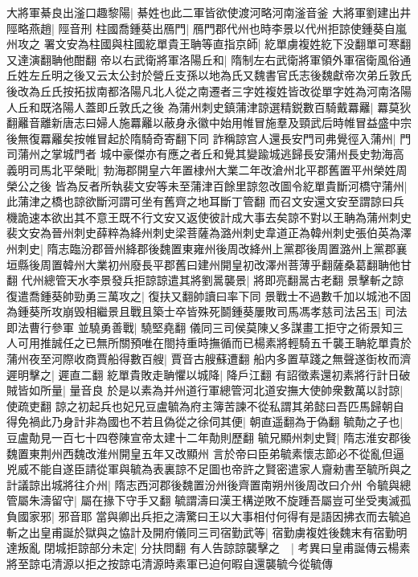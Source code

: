 大將軍綦良出滏口趣黎陽|{
	綦姓也此二軍皆欲使渡河略河南滏音釜}
大將軍劉建出井陘略燕趙|{
	陘音刑}
柱國喬鍾葵出鴈門|{
	鴈門郡代州也時李景以代州拒諒使鍾葵自嵐州攻之}
署文安為柱國與柱國紇單貴王聃等直指京師|{
	紇單虜複姓紇下没翻單可寒翻又達演翻聃他酣翻}
帝以右武衛將軍洛陽丘和|{
	隋制左右武衛將軍領外軍宿衛風俗通丘姓左丘明之後又云太公封於營丘支孫以地為氏又魏書官氏志後魏獻帝次弟丘敦氏後改為丘氏按拓拔南都洛陽凡北人從之南遷者三字姓複姓皆改從單字姓為河南洛陽人丘和既洛陽人蓋即丘敦氏之後}
為蒲州刺史鎮蒲津諒選精鋭數百騎戴羃䍦|{
	羃莫狄翻䍦音離新唐志曰婦人施羃䍦以蔽身永徽中始用帷冒施羣及頸武后時帷冒益盛中宗後無復羃䍦矣按帷冒起於隋騎奇寄翻下同}
詐稱諒宫人還長安門司弗覺徑入蒲州|{
	門司蒲州之掌城門者}
城中豪傑亦有應之者丘和覺其變踰城逃歸長安蒲州長史勃海高義明司馬北平榮毗|{
	勃海郡開皇六年置棣州大業二年改滄州北平郡舊置平州榮姓周榮公之後}
皆為反者所執裴文安等未至蒲津百餘里諒忽改圖令紇單貴斷河橋守蒲州|{
	此蒲津之橋也諒欲斷河謂可坐有舊齊之地耳斷丁管翻}
而召文安還文安至謂諒曰兵機詭速本欲出其不意王既不行文安又返使彼計成大事去矣諒不對以王聃為蒲州刺史裴文安為晉州刺史薛粹為絳州刺史梁菩薩為潞州刺史韋道正為韓州刺史張伯英為澤州刺史|{
	隋志臨汾郡晉州絳郡後魏置東雍州後周改絳州上黨郡後周置潞州上黨郡襄垣縣後周置韓州大業初州廢長平郡舊曰建州開皇初改澤州菩薄乎翻薩桑葛翻聃他甘翻}
代州總管天水李景發兵拒諒諒遣其將劉暠襲景|{
	將即亮翻暠古老翻}
景擊斬之諒復遣喬鍾葵帥勁勇三萬攻之|{
	復扶又翻帥讀曰率下同}
景戰士不過數千加以城池不固為鍾葵所攻崩毁相繼景且戰且築士卒皆殊死鬬鍾葵屢敗司馬馮孝慈司法呂玉|{
	司法即法曹行參軍}
並驍勇善戰|{
	驍堅堯翻}
儀同三司侯莫陳乂多謀畫工拒守之術景知三人可用推誠任之已無所關預唯在閤持重時撫循而已楊素將輕騎五千襲王聃紇單貴於蒲州夜至河際收商賈船得數百艘|{
	賈音古艘蘇遭翻}
船内多置草踐之無聲遂衘枚而濟遲明擊之|{
	遲直二翻}
紇單貴敗走聃懼以城降|{
	降戶江翻}
有詔徵素還初素將行計日破賊皆如所量|{
	量音良}
於是以素為并州道行軍總管河北道安撫大使帥衆數萬以討諒|{
	使疏吏翻}
諒之初起兵也妃兄豆盧毓為府主簿苦諫不從私謂其弟懿曰吾匹馬歸朝自得免禍此乃身計非為國也不若且偽從之徐伺其便|{
	朝直遥翻為于偽翻}
毓勣之子也|{
	豆盧勣見一百七十四卷陳宣帝太建十二年勣則歷翻}
毓兄顯州刺史賢|{
	隋志淮安郡後魏置東荆州西魏改淮州開皇五年又改顯州}
言於帝曰臣弟毓素懷志節必不從亂但逼兇威不能自遂臣請從軍與毓為表裏諒不足圖也帝許之賢密遣家人齎勑書至毓所與之計議諒出城將往介州|{
	隋志西河郡後魏置汾州後齊置南朔州後周改曰介州}
令毓與總管屬朱濤留守|{
	屬在掾下守手又翻}
毓謂濤曰漢王構逆敗不旋踵吾屬豈可坐受夷滅孤負國家邪|{
	邪音耶}
當與卿出兵拒之濤驚曰王以大事相付何得有是語因拂衣而去毓追斬之出皇甫誕於獄與之恊計及開府儀同三司宿勤武等|{
	宿勤虜複姓後魏末有宿勤明達叛亂}
閉城拒諒部分未定|{
	分扶問翻}
有人告諒諒襲擊之　|{
	考異曰皇甫誕傳云楊素將至諒屯清源以拒之按諒屯清源時素軍已迫何暇自還襲毓今從毓傳}
